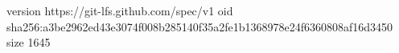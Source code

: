version https://git-lfs.github.com/spec/v1
oid sha256:a3be2962ed43e3074f008b285140f35a2fe1b1368978e24f6360808af16d3450
size 1645
